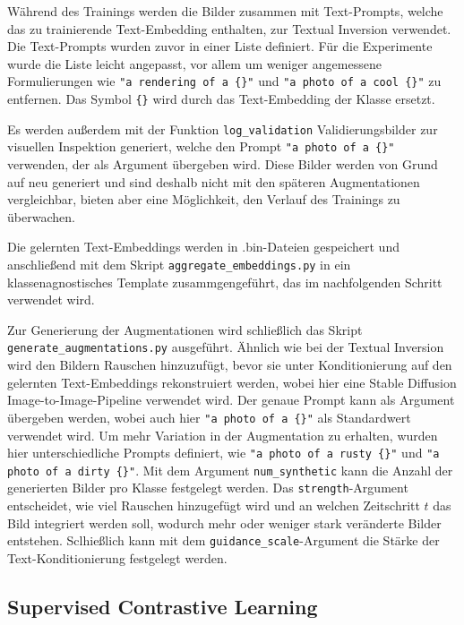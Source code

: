 Während des Trainings werden die Bilder zusammen mit Text-Prompts, welche das zu trainierende Text-Embedding enthalten, zur Textual Inversion verwendet. Die Text-Prompts wurden zuvor in einer Liste definiert. Für die Experimente wurde die Liste leicht angepasst, vor allem um weniger angemessene Formulierungen wie \lstinline|"a rendering of a {}"| und \lstinline|"a photo of a cool {}"| zu entfernen. Das Symbol \lstinline|{}| wird durch das Text-Embedding der Klasse ersetzt.

Es werden außerdem mit der Funktion \lstinline{log_validation} Validierungsbilder zur visuellen Inspektion generiert, welche den Prompt \lstinline|"a photo of a {}"| verwenden, der als Argument übergeben wird. Diese Bilder werden von Grund auf neu generiert und sind deshalb nicht mit den späteren Augmentationen vergleichbar, bieten aber eine Möglichkeit, den Verlauf des Trainings zu überwachen.

Die gelernten Text-Embeddings werden in .bin-Dateien gespeichert und anschließend mit dem Skript \lstinline{aggregate_embeddings.py} in ein klassenagnostisches Template zusammgengeführt, das im nachfolgenden Schritt verwendet wird.

Zur Generierung der Augmentationen wird schließlich das Skript \lstinline{generate_augmentations.py} ausgeführt. Ähnlich wie bei der Textual Inversion wird den Bildern Rauschen hinzuzufügt, bevor sie unter Konditionierung auf den gelernten Text-Embeddings rekonstruiert werden, wobei hier eine Stable Diffusion Image-to-Image-Pipeline verwendet wird. Der genaue Prompt kann als Argument übergeben werden, wobei auch hier \lstinline|"a photo of a {}"| als Standardwert verwendet wird. Um mehr Variation in der Augmentation zu erhalten, wurden hier unterschiedliche Prompts definiert, wie \lstinline|"a photo of a rusty {}"| und \lstinline|"a photo of a dirty {}"|. Mit dem Argument \lstinline{num_synthetic} kann die Anzahl der generierten Bilder pro Klasse festgelegt werden. Das \lstinline{strength}-Argument entscheidet, wie viel Rauschen hinzugefügt wird und an welchen Zeitschritt $t$ das Bild integriert werden soll, wodurch mehr oder weniger stark veränderte Bilder entstehen. Sclhießlich kann mit dem \lstinline{guidance_scale}-Argument die Stärke der Text-Konditionierung festgelegt werden.

\subsection{Supervised Contrastive Learning} \label{subsec:supcon-implementation}

